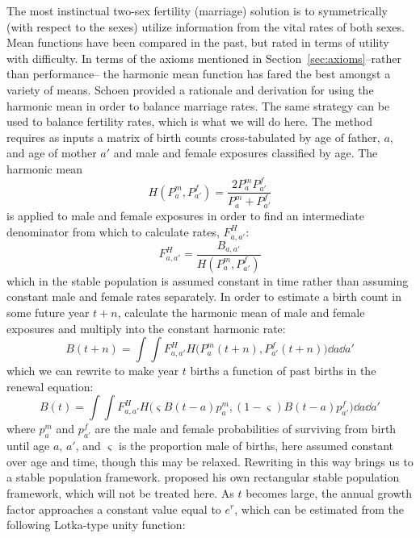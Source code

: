 \FloatBarrier

The most instinctual two-sex fertility (marriage) solution is to symmetrically
(with respect to the sexes) utilize information from the vital rates of both
sexes. Mean functions have been compared in the past\citep[see
e.g.][]{keyfitz1972mathematics}, but rated in terms of utility with difficulty.
In terms of the axioms mentioned in Section~\ref{sec:axioms}--rather than
performance-- the harmonic mean function has fared the best amongst a variety of
means. Schoen \citep{schoen1978standardized, schoen1977two, schoen1981harmonic}
provided a rationale and derivation for using the harmonic mean in order to 
balance marriage rates. The same strategy can be used to balance fertility 
rates, which is what we will do here. The method requires as inputs a matrix 
of birth counts cross-tabulated by age of father, $a$, and age of mother $a'$ 
and male and female exposures classified by age. The harmonic mean
\begin{equation}
H(P_a^m, P_{a'}^f) = \frac{2 P_a^m P_{a'}^f}{P_a^m + P_{a'}^f}
\end{equation}
is applied to male and female exposures in order to find an intermediate
denominator from which to calculate rates, $F_{a,a'}^H$:
 \FloatBarrier
 \begin{equation}
 F_{a,a'}^H = \frac{B_{a,a'}}{H(P_a^m, P_{a'}^f)}
 \end{equation}
which in the stable population is assumed constant in time rather than
assuming constant male and female rates separately. In order to estimate 
a birth count in some future year $t+n$, calculate the harmonic mean
of male and female exposures and multiply into the constant harmonic rate:
 \begin{equation}
 B(t+n) = \int \int F_{a,a'}^H H\Big(P_{a}^m(t+n), P_{a'}^f(t+n)\Big) \dd a \dd
 a'
 \end{equation}
which we can rewrite to make year $t$ births a function of past births in the
renewal equation:
 \begin{equation}
 B(t) = \int \int F_{a,a'}^H H\Big(\varsigma B(t-a)p_a^m, (1-\varsigma) B(t-a)
 p_{a'}^f\Big) \dd a
 \dd a'
 \end{equation}
where $p_a^m$ and $p_{a'}^f$ are the male and female probabilities of surviving
from birth until age $a$, $a'$, and $\varsigma$ is the proportion male of
births, here assumed constant over age and time, though this may be relaxed.
Rewriting in this way brings us to a stable population framework. \citet{schoen1977two} 
proposed his own rectangular stable population framework, which 
will not be treated here. As $t$ becomes large, the annual growth factor
approaches a constant value equal to $e^r$, which can be estimated from the
following Lotka-type unity function: 


